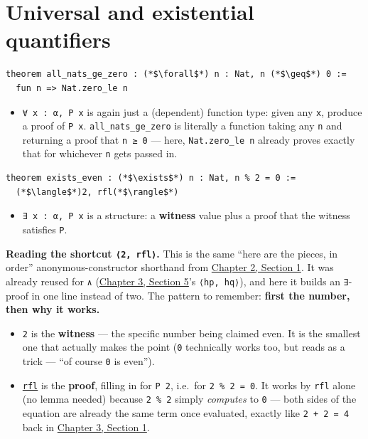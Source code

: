 \section{Universal and existential quantifiers}\label{sec:03-propositions-and-proofs:06-quantifiers:1}

\begin{lstlisting}
theorem all_nats_ge_zero : (*$\forall$*) n : Nat, n (*$\geq$*) 0 :=
  fun n => Nat.zero_le n
\end{lstlisting}

\begin{itemize}
\tightlist
\item
  \texttt{∀ x : α, P x} is again just a (dependent) function type: given any \texttt{x}, produce a proof of \texttt{P x}. \texttt{all\_\allowbreak{}nats\_\allowbreak{}ge\_\allowbreak{}zero} is literally a function taking any \texttt{n} and returning a proof that \texttt{n ≥ 0} --- here, \texttt{Nat.zero\_\allowbreak{}le n} already proves exactly that for whichever \texttt{n} gets passed in.
\end{itemize}

\begin{lstlisting}
theorem exists_even : (*$\exists$*) n : Nat, n % 2 = 0 :=
  (*$\langle$*)2, rfl(*$\rangle$*)
\end{lstlisting}

\begin{itemize}
\tightlist
\item
  \texttt{∃ x : α, P x} is a structure: a \textbf{witness} value plus a proof that the witness satisfies \texttt{P}.
\end{itemize}

\textbf{Reading the shortcut \texttt{⟨2, rfl⟩}.} This is the same ``here are the pieces, in order'' anonymous-constructor shorthand from \hyperref[sec:02-functions-and-structures:01-structure-basics:1]{Chapter 2, Section 1}. It was already reused for \texttt{∧} (\hyperref[sec:03-propositions-and-proofs:05-and-or-not:1]{Chapter 3, Section 5}'s \texttt{⟨hp, hq⟩}), and here it builds an \texttt{∃}-proof in one line instead of two. The pattern to remember: \textbf{first the number, then why it works.}

\begin{itemize}
\tightlist
\item
  \texttt{2} is the \textbf{witness} --- the specific number being claimed even. It is the smallest one that actually makes the point (\texttt{0} technically works too, but reads as a trick --- ``of course \texttt{0} is even'').
\item
  \href{https://lean-lang.org/doc/reference/latest/Tactic-Proofs/Tactic-Reference/}{\texttt{rfl}} is the \textbf{proof}, filling in for \texttt{P 2}, i.e.~for \texttt{2 \% 2 = 0}. It works by \texttt{rfl} alone (no lemma needed) because \texttt{2 \% 2} simply \emph{computes} to \texttt{0} --- both sides of the equation are already the same term once evaluated, exactly like \texttt{2 + 2 = 4} back in \hyperref[sec:03-propositions-and-proofs:01-prop:1]{Chapter 3, Section 1}.
\end{itemize}

